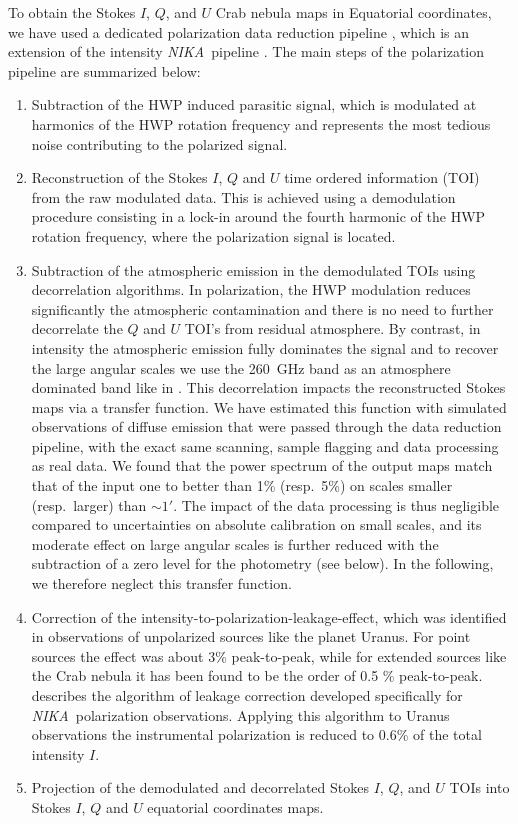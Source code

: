 \documentclass[twocolumn,traditabstract]{aa}
\def\NIKA{\textit{NIKA}}
\begin{document}
To obtain the Stokes $I$, $Q$, and $U$ Crab nebula maps in Equatorial coordinates, we have used a dedicated
polarization data reduction pipeline \citep{ritacco2017}, which is an extension
of the intensity \NIKA\ pipeline \citep{catalano2014,adam2013}. The main steps
of the polarization pipeline are summarized below:
\begin{enumerate}
\item  Subtraction of the HWP induced parasitic signal, which is modulated at harmonics of the HWP rotation frequency and represents the most tedious noise contributing to the polarized signal. 
\item Reconstruction of the Stokes $I$, $Q$ and $U$ time ordered information
  (TOI) from the raw modulated data. This is achieved using a demodulation
  procedure consisting in a lock-in around the fourth harmonic of the HWP rotation frequency, where the polarization signal is located.
\item Subtraction of the atmospheric emission in the demodulated TOIs using
  decorrelation algorithms. In polarization, the HWP modulation reduces
  significantly the atmospheric contamination and there is no need to
    further decorrelate the $Q$ and $U$ TOI's from residual atmosphere. By contrast, in
  intensity the atmospheric emission fully dominates the signal and to recover
  the large angular scales we use the 260~GHz band as an atmosphere
  dominated band like in \cite{adam2013}.  This decorrelation impacts the
    reconstructed Stokes maps via a transfer function. We have estimated this function
    with simulated observations of diffuse emission that were passed through the
    data reduction pipeline, with the exact same scanning, sample flagging and data
    processing as real data. We found that the power spectrum of the output maps
    match that of the input one to better than 1\% (resp.~5\%) on scales smaller
    (resp.~larger) than $\sim 1'$. The impact of the data processing is thus
    negligible compared to uncertainties on absolute calibration on small
    scales, and its moderate effect on large angular scales is further reduced
    with the subtraction of a zero level for the photometry (see below). In the
    following, we therefore neglect this transfer function.


\item Correction of the intensity-to-polarization-leakage-effect, which was
  identified in observations of unpolarized sources like the planet Uranus. For
  point sources the effect was about 3\% peak-to-peak, while for extended sources like the Crab nebula it has been found to be the order of 0.5 \% peak-to-peak. 
  \cite{ritacco2017} describes the algorithm of leakage correction developed specifically for \NIKA\ polarization observations. Applying this algorithm to Uranus observations the instrumental polarization is reduced to 0.6\% of the total intensity $I$.
  \item Projection of the demodulated and decorrelated Stokes $I$, $Q$, and $U$ TOIs into Stokes $I$, $Q$ and $U$ equatorial coordinates maps.

\end{enumerate}
\end{document}
